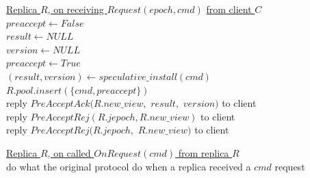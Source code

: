 \documentclass[twocolumn]{article}
\begin{document}
\begin{algorithm}
\caption{JetPack - PreAccept}
    \label{alg:jetpack_preaccept}
    \setcounter{AlgoLine}{16}
    
    \underline{Replica $R$, on receiving $Request(epoch, cmd)$}
    \underline{from client $C$}\\
     {
        $preaccept\gets False$\\
        $result\gets NULL$\\
        $version\gets NULL$\\
         {
            $preaccept\gets True$\\
             {
                $(result, version)\gets  speculative\_install(cmd)$\label{line:speculativeinstall}\\
            }
        }
        $R.pool.insert(\{cmd, preaccept\})$\label{line:commandpoolinsert}\\
         {
            reply $PreAcceptAck(R.new\_view,$ $result,$ $version)$ to client\\
        } {
            reply $PreAcceptRej(R.jepoch, R.new\_view)$ to client\\
        }
    } {
        reply $PreAcceptRej(R.jepoch,$ $R.new\_view)$ to client\\
    }

    \vskip 10pt
    \underline{Replica $R$, on called $OnRequest(cmd)$ from }
    \underline{replica $R$}\\
    do what the original protocol do when a replica received a $cmd$ request
\end{algorithm}
\end{document}

